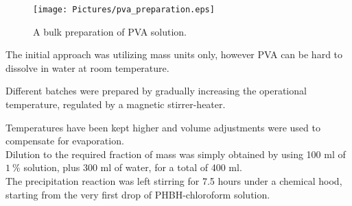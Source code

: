 \documentclass{article}
\begin{document}


                \begin{figure}[h!]
                    \centering
                    \texttt{[image: Pictures/pva\_preparation.eps]}
                    \caption{A bulk preparation of PVA solution.}
                    \label{fig:PVA}
                \end{figure}

        The initial approach was utilizing mass units only, however PVA can be hard to dissolve in water at room temperature. 
        
        Different batches were prepared by gradually increasing the operational temperature, regulated by a magnetic stirrer-heater. 

%

        Temperatures have been kept higher and volume adjustments were used to compensate for evaporation. \\ 

%

        Dilution to the required fraction of mass was simply obtained by using 100 ml of $1 \ \%$ solution, 
        plus 300 ml of water, for a total of 400 ml. \\ 

        The precipitation reaction was left stirring for 7.5 hours under a 
        chemical hood, starting from the very first drop of PHBH-chloroform solution. 
\end{document}

